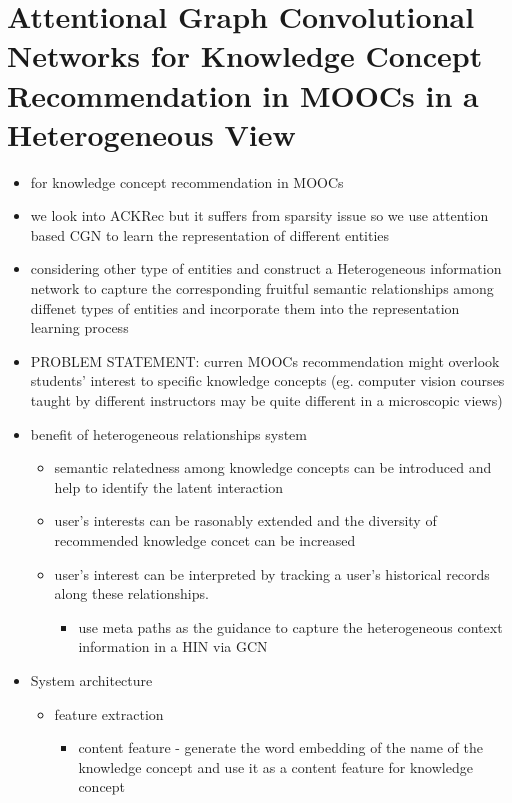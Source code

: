 \documentclass{report}
\begin{document}
\section{Attentional Graph Convolutional Networks for Knowledge Concept Recommendation in MOOCs in a Heterogeneous View}
\begin{itemize}
    \item for knowledge concept recommendation in MOOCs 
    \item we look into ACKRec but it suffers from sparsity issue so we use attention based CGN to learn the representation of different entities
    \item considering other type of entities and construct a Heterogeneous information network to capture the corresponding fruitful semantic relationships among diffenet types of entities and incorporate them into the representation learning process
    \item PROBLEM STATEMENT: curren MOOCs recommendation might overlook students' interest to specific knowledge concepts (eg. computer vision courses taught by different instructors may be quite different in a microscopic views)
    \item benefit of heterogeneous relationships system 
    \begin{itemize}
        \item semantic relatedness among knowledge concepts can be introduced and help to identify the latent interaction
        \item user's interests can be rasonably extended and the diversity of recommended knowledge concet can be increased
        \item user's interest can be interpreted by tracking a user's historical records along these relationships.
        \begin{itemize}
            \item use meta paths as the guidance to capture the heterogeneous context information in a HIN via GCN
        \end{itemize}
    \end{itemize}
    \item System architecture
    \begin{itemize}
        \item feature extraction
        \begin{itemize}
            \item content feature - generate the word embedding of the name of the knowledge concept and use it as a content feature for knowledge concept

\end{itemize}
\end{itemize}
\end{itemize}
\end{document}
